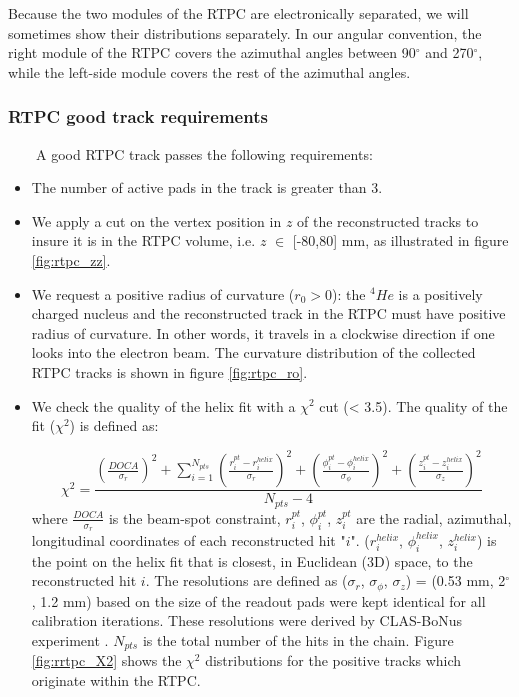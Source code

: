Because the two modules of the RTPC are electronically separated, we will 
sometimes show their distributions separately. In our angular convention, the 
right module of the RTPC covers the azimuthal angles between 90$^{\circ}$ and 
270$^{\circ}$, while the left-side module covers the rest of the azimuthal 
angles. 

\subsubsection{RTPC good track requirements} \label{good_track_req}

~~~~A good RTPC track passes the following requirements:
\begin{itemize}
\item The number of active pads in the track is greater than 3. 

\item We apply a cut on the vertex position in $z$ of the reconstructed tracks to insure it is in the RTPC volume, i.e. $z$ $\in$ [-80,80] mm, as illustrated in figure \ref{fig:rtpc_zz}.  

\item We request a positive radius of curvature ($r_{0}>0$): the $^4He$ is a positively 
   charged nucleus and the reconstructed track in the RTPC must have positive 
   radius of curvature. In other words, it travels in a clockwise direction if 
   one looks into the electron beam. The curvature distribution of the 
   collected RTPC tracks is shown in figure \ref{fig:rtpc_ro}.

\item We check the quality of the helix fit with a $\chi^{2}$ cut (< 3.5). The quality of the fit ($\chi^{2}$) is defined as:

\begin{equation}
   \chi^{2} = \frac{\displaystyle \left(\frac{DOCA}{\sigma_r}\right)^2 
       + \sum_{i = 1}^{ N_{pts}} \left(\frac{r^{pt}_{i} 
      - r^{helix}_{i} }{\sigma_{r}}\right)^{2}  + \left( \frac{\phi^{pt}_{i} - 
      \phi^{helix}_{i} }{\sigma_{\phi}}\right)^{2} + \left( \frac{z^{pt}_{i} - 
   z^{helix}_{i} }{\sigma_{z} } \right)^{2}}{N_{pts} - 4}
\end{equation}
where $\frac{DOCA}{\sigma_r}$ is the beam-spot constraint, $r^{pt}_{i}$, 
$\phi^{pt}_{i}$, $z^{pt}_{i}$ are the radial, azimuthal, longitudinal 
coordinates of each reconstructed hit "$i$". ($r^{helix}_{i}$,
$\phi^{helix}_{i}$, $z^{helix}_{i}$) is the point on the helix fit that is 
closest, in Euclidean (3D) space, to the reconstructed hit $i$. The resolutions 
are defined as ($\sigma_{r}$, $\sigma_{\phi}$, $\sigma_{z}$) = (0.53 mm, 
2$^{\circ}$, 1.2 mm) based on the size
of the readout pads were kept identical for all calibration iterations. These 
resolutions were derived by CLAS-BoNus experiment \cite{BONUS}. $N_{pts}$ is 
the total number of the hits in the chain.  Figure \ref{fig:rrtpc_X2} shows the 
$\chi^{2}$ distributions for the positive tracks which originate within the 
RTPC.


\end{itemize}
